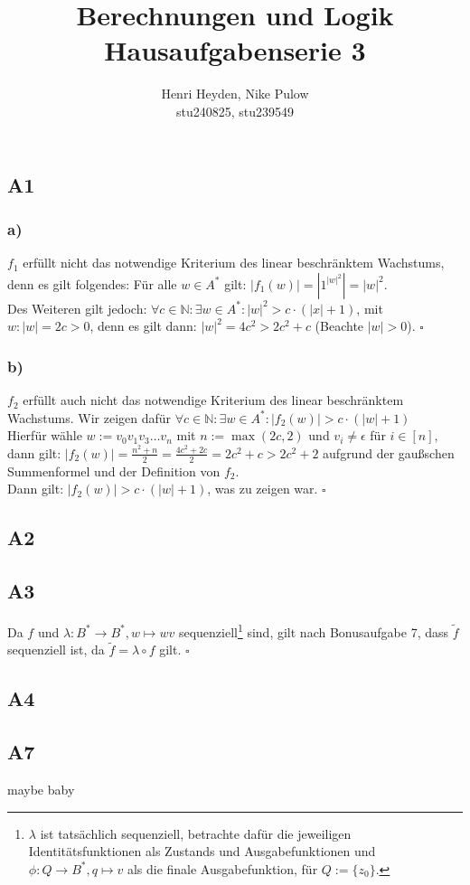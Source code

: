 \documentclass[12pt, a4paper]{article}
\title{Berechnungen und Logik\\Hausaufgabenserie 3}
\author{Henri Heyden, Nike Pulow \\ \small stu240825, stu239549}
\date{}
\newcommand*{\qed}{\null\nobreak\hfill\ensuremath{\square}}
\begin{document}
\maketitle

\doublespacing
\subsection*{A1}
\subsubsection*{a)}
\(f_1\) erfüllt nicht das notwendige Kriterium des linear beschränktem Wachstums, denn es gilt folgendes: Für alle \(w \in A^*\) gilt: \(|f_1(w)| = |1^{|w|^2}| = |w|^2\).\\
Des Weiteren gilt jedoch: \(\forall c \in \mathbb N: \exists w \in A^*: |w|^2 > c\cdot(|x| + 1)\), mit \(w : |w| = 2c > 0\), denn es gilt dann: \(|w|^2 = 4c^2 > 2c^2 + c\) (Beachte \(|w| > 0\)). \qed
\subsubsection*{b)}
\(f_2\) erfüllt auch nicht das notwendige Kriterium des linear beschränktem Wachstums. 
Wir zeigen dafür \(\forall c \in \mathbb N: \exists w \in A^*: |f_2(w)| > c\cdot(|w| + 1)\) \\
Hierfür wähle \(w := v_0v_1v_3 \dots v_n\) mit \(n := \max(2c, 2)\) und \(v_i \ne \epsilon\) für \(i \in [n]\), dann gilt: 
\(|f_2(w)| = \frac{n^2 + n}{2} = \frac{4c^2 + 2c}{2} = 2c^2+c > 2c^2 + 2\) aufgrund der gaußschen Summenformel und der Definition von \(f_2\).
\\Dann gilt: \(|f_2(w)| > c\cdot(|w| + 1)\), was zu zeigen war. \qed
\subsection*{A2}

\subsection*{A3}
Da \(f\) und \(\lambda : B^* \rightarrow B^*, w \mapsto wv\) sequenziell\footnote[1]{\(\lambda\) ist tatsächlich sequenziell, betrachte dafür die jeweiligen Identitätsfunktionen als Zustands und Ausgabefunktionen und \(\phi : Q \rightarrow B^*, q \mapsto v\) als die finale Ausgabefunktion, für \(Q := \{z_0\}\).} sind, gilt nach Bonusaufgabe 7, dass \(\tilde{f}\) sequenziell ist, da \(\tilde{f} = \lambda \circ f\) gilt. \qed
\subsection*{A4}

\subsection*{A7}
maybe baby
\end{document}
